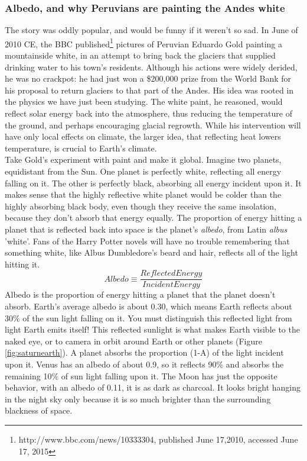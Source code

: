 \subsubsection{Albedo, and why Peruvians are painting the Andes white}
The story was oddly popular, and would be funny if it weren't so sad. In June of 2010 CE, the BBC published\footnote{http://www.bbc.com/news/10333304, published June 17,2010, accessed June 17, 2015} pictures of Peruvian Eduardo Gold painting a mountainside white, in an attempt to bring back the glaciers that supplied drinking water to his town's residents. Although his actions were widely derided, he was no crackpot: he had just won a \$200,000 prize from the World Bank for his proposal to return glaciers to that part of the Andes. His idea was rooted in the physics we have just been studying. The white paint, he reasoned, would reflect solar energy back into the atmosphere, thus reducing the temperature of the ground, and perhaps encouraging glacial regrowth. While his intervention will have only local effects on climate, the larger idea, that reflecting heat lowers temperature, is crucial to Earth's climate.\\
Take Gold's experiment with paint and make it global. Imagine two planets, equidistant from the Sun. One planet is perfectly white, reflecting all energy falling on it. The other is perfectly black, absorbing all energy incident upon it. It makes sense that the highly reflective white planet would be colder than the highly absorbing black body, even though they receive the same insolation, because they don't absorb that energy equally. The proportion of energy hitting a planet that is reflected back into space is the planet's \emph{albedo}, from Latin \textit{albus} 'white'. Fans of the Harry Potter novels will have no trouble remembering that something white, like Albus Dumbledore's beard and hair, reflects all of the light hitting it.\\
\begin{equation}
	Albedo \equiv\frac{Reflected Energy}{Incident Energy}
\end{equation}
Albedo is the proportion of energy hitting a planet that the planet doesn't absorb. Earth's average albedo is about 0.30, which means Earth reflects about 30\% of the sun light falling on it. You must distinguish this reflected light from light Earth emits itself! This reflected sunlight is what makes Earth visible to the naked eye, or to camera in orbit around Earth or other planets (Figure \ref{fig:saturnearth}). A planet absorbs the proportion (1-A) of the light incident upon it. Venus has an albedo of about 0.9, so it reflects 90\% and absorbs the remaining 10\% of sun light falling upon it. The Moon has just the opposite behavior, with an albedo of 0.11, it is as dark as charcoal. It looks bright hanging in the night sky only because it is so much brighter than the surrounding blackness of space. 


